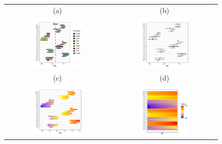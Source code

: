 \documentclass[article]{jss}
\begin{document}
\begin{appendix}
\begin{figure}[t!]
\centering
\begin{tabular}{cc}
(a) & (b) \\
\includegraphics[width=0.5\textwidth]{pic/index_bar} &
\includegraphics[width=0.5\textwidth]{pic/index} \\
(c) & (d) \\
\includegraphics[width=0.5\textwidth]{pic/index_image1} &
\includegraphics[width=0.5\textwidth]{pic/index_image2} 

\end{tabular}
\end{figure}
\end{appendix}
\end{document}
